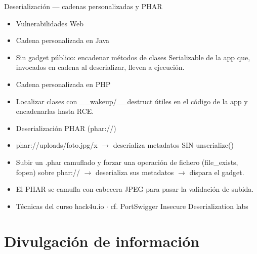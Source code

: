 \documentclass[aspectratio=169,10pt]{beamer}
\begin{document}
\begin{frame}[allowframebreaks]{Deserialización --- cadenas personalizadas y PHAR}
\small
  \begin{itemize}
  \item Vulnerabilidades Web
  \item Cadena personalizada en Java
  \item Sin gadget público: encadenar métodos de clases Serializable de la app que, invocados en cadena al deserializar, lleven a ejecución.
  \item Cadena personalizada en PHP
  \item Localizar clases con \_\_wakeup/\_\_destruct útiles en el código de la app y encadenarlas hasta RCE.
  \item Deserialización PHAR (phar://)
  \item phar://uploads/foto.jpg/x $\rightarrow$ deserializa metadatos SIN unserialize()
  \item Subir un .phar camuflado y forzar una operación de fichero (file\_exists, fopen) sobre phar:// $\rightarrow$ deserializa sus metadatos $\rightarrow$ dispara el gadget.
  \item El PHAR se camufla con cabecera JPEG para pasar la validación de subida.
  \item Técnicas del curso hack4u.io $\cdot$ cf. PortSwigger Insecure Deserialization labs
  \end{itemize}
\end{frame}

\section{Divulgación de información}
\end{document}
